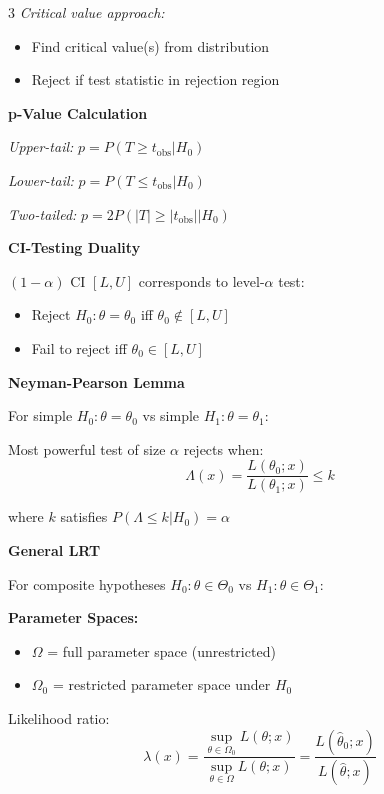 \documentclass[10pt,letterpaper]{article}
\begin{document}
\begin{multicols}{3}
\textit{Critical value approach:}
\begin{itemize}
\item Find critical value(s) from distribution
\item Reject if test statistic in rejection region
\end{itemize}

\textbf{p-Value Calculation}

\textit{Upper-tail:} $p = P(T \ge t_{\text{obs}} | H_0)$

\textit{Lower-tail:} $p = P(T \le t_{\text{obs}} | H_0)$

\textit{Two-tailed:} $p = 2P(|T| \ge |t_{\text{obs}}| | H_0)$

\textbf{CI-Testing Duality}

$(1-\alpha)$ CI $[L, U]$ corresponds to level-$\alpha$ test:
\begin{itemize}
\item Reject $H_0: \theta = \theta_0$ iff $\theta_0 \notin [L, U]$
\item Fail to reject iff $\theta_0 \in [L, U]$
\end{itemize}

\vspace{2mm}
\vspace{0.5mm}

\textbf{Neyman-Pearson Lemma}

For simple $H_0: \theta = \theta_0$ vs simple $H_1: \theta = \theta_1$:

Most powerful test of size $\alpha$ rejects when:
$$\Lambda(x) = \frac{L(\theta_0; x)}{L(\theta_1; x)} \le k$$

where $k$ satisfies $P(\Lambda \le k | H_0) = \alpha$

\textbf{General LRT}

For composite hypotheses $H_0: \theta \in \Theta_0$ vs $H_1: \theta \in \Theta_1$:

\textbf{Parameter Spaces:}
\begin{itemize}
\item $\Omega$ = full parameter space (unrestricted)
\item $\Omega_0$ = restricted parameter space under $H_0$
\end{itemize}

Likelihood ratio:
$$\lambda(x) = \frac{\sup_{\theta \in \Omega_0} L(\theta; x)}{\sup_{\theta \in \Omega} L(\theta; x)} = \frac{L(\hat{\theta}_0; x)}{L(\hat{\theta}; x)}$$


\end{multicols}
\end{document}

